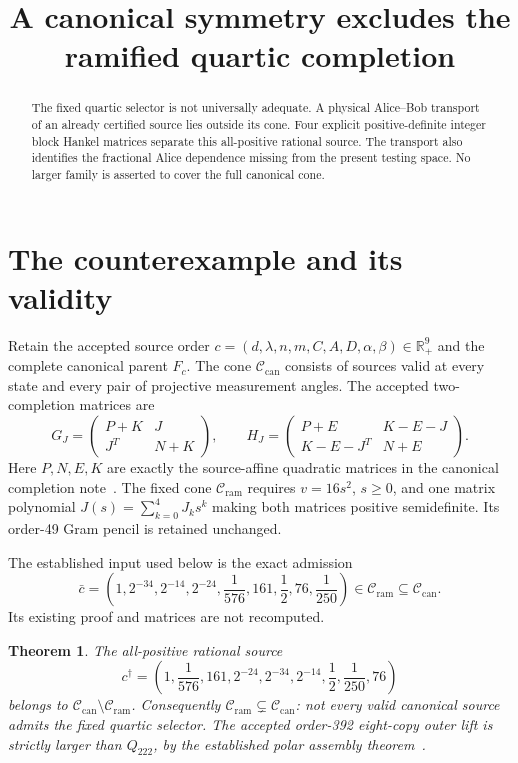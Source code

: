 \documentclass[10pt]{article}
\title{A canonical symmetry excludes the ramified quartic completion}
\author{}\date{}
\newtheorem{theorem}{Theorem}
\newcommand{\R}{\mathbb R}
\newcommand{\Cr}{\mathcal C_{\mathrm{ram}}}
\newcommand{\Cc}{\mathcal C_{\mathrm{can}}}
\begin{document}
\maketitle\vspace{-2.5em}
\begin{abstract}
The fixed quartic selector is not universally adequate. A physical
Alice--Bob transport of an already certified source lies outside its cone.
Four explicit positive-definite integer block Hankel matrices separate this
all-positive rational source. The transport also identifies the fractional
Alice dependence missing from the present testing space. No larger family
is asserted to cover the full canonical cone.
\end{abstract}

\section{The counterexample and its validity}

Retain the accepted source order
$c=(d,\lambda,n,m,C,A,D,\alpha,\beta)\in\R_+^9$ and the complete
canonical parent $F_c$. The cone $\Cc$ consists of sources valid at every
state and every pair of projective measurement angles. The accepted
two-completion matrices are
\[
 G_J=\begin{pmatrix}P+K&J\\J^T&N+K\end{pmatrix},\qquad
 H_J=\begin{pmatrix}P+E&K-E-J\\K-E-J^T&N+E\end{pmatrix}.
\]
Here $P,N,E,K$ are exactly the source-affine quadratic matrices in the
canonical completion note~\cite{accepted}. The fixed cone $\Cr$ requires
$v=16s^2$, $s\ge0$, and one matrix polynomial
$J(s)=\sum_{k=0}^4J_ks^k$ making both matrices positive semidefinite.
Its order-49 Gram pencil is retained unchanged.

The established input used below is the exact admission
\[
 \bar c=\left(1,2^{-34},2^{-14},2^{-24},\frac1{576},161,
                   \frac12,76,\frac1{250}\right)\in\Cr\subseteq\Cc.
 \tag{1}
\]
Its existing proof and matrices are not recomputed.

\begin{theorem}\label{thm:main}
The all-positive rational source
\[
 \boxed{c^\dagger=\left(1,\frac1{576},161,2^{-24},2^{-34},2^{-14},
                   \frac12,\frac1{250},76\right)}           \tag{2}
\]
belongs to $\Cc\setminus\Cr$. Consequently
$\Cr\subsetneq\Cc$: not every valid canonical source admits the fixed
quartic selector. The accepted order-392 eight-copy outer lift is strictly
larger than $Q_{222}$, by the established polar assembly theorem~\cite{assembly}.
\end{theorem}
\end{document}
